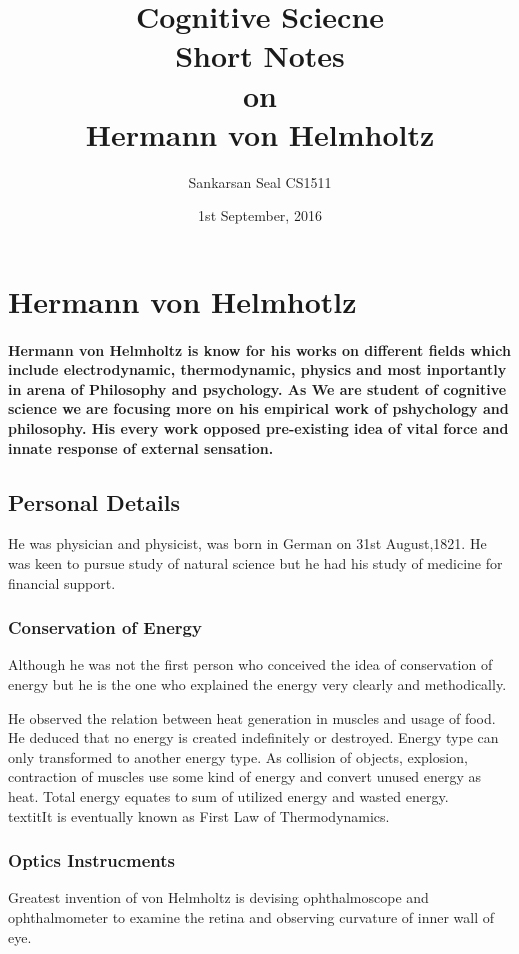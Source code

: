 \documentclass[11pt]{article}
\begin{document}
\title{Cognitive Sciecne\\ Short Notes\\ on\\ Hermann von Helmholtz}
\author{Sankarsan Seal CS1511}
\date{1st September, 2016}
\maketitle

\section{Hermann von Helmhotlz}
\paragraph{Hermann von Helmholtz is know for his works on different fields which include electrodynamic, thermodynamic, physics and most inportantly in arena of Philosophy and psychology. As We are student of cognitive science we are focusing more on his empirical work of pshychology and philosophy. His every work opposed pre-existing idea of vital force and innate response of external sensation.}

\subsection{Personal Details}
He was physician and physicist, was born in German on 31st August,1821. He was keen to pursue study of natural science but he had his study of medicine for financial support.

\subsubsection{Conservation of Energy}
Although he was not the first person who conceived the idea of conservation of energy but he is the one who explained the energy very clearly and methodically.

He observed the relation between heat generation in muscles and  usage of food. He deduced that no energy is created indefinitely or destroyed. Energy type can only transformed to another energy type. As collision of objects, explosion, contraction of muscles use some kind of energy and convert unused energy as heat. Total energy equates to  sum of utilized energy and wasted energy. \\textit{It is eventually known as First Law of Thermodynamics.}

\subsubsection{Optics Instrucments}
Greatest invention of von Helmholtz is devising ophthalmoscope and ophthalmometer to examine the retina and observing curvature of inner wall of eye.
\end{document}
